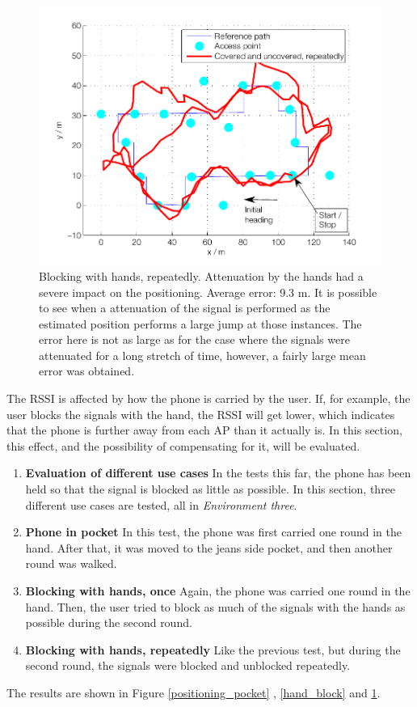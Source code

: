 \documentclass{LTHthesis}
\begin{document}
\begin{figure}

\includegraphics[width=1\textwidth ]{images/adapt_parameters/hand_block_repeatedly}
\caption{Blocking with hands, repeatedly. Attenuation by the hands had a severe impact on the positioning. Average error: 9.3 m. It is possible to see when a attenuation of the signal is performed as the estimated position performs a large jump at those instances. The error here is not as large as for the case where the signals were attenuated for a long stretch of time, however, a fairly large mean error was obtained. }\label{hand_block_repeatedly}
\end{figure}
%

%
The RSSI is affected by how the phone is carried by the user. If, for example, the user blocks the signals with the hand, the RSSI will get lower, which indicates that the phone is further away from each AP than it actually is. In this section, this effect, and the possibility of compensating for it, will be evaluated.
%
\begin{enumerate}
\item \textbf{Evaluation of different use cases}
In the tests this far, the phone has been held so that the signal is blocked as little as possible. In this section, three different use cases are tested, all in \emph{Environment three}. 

\item \textbf{Phone in pocket}
In this test, the phone was first carried one round in the hand. After that, it was moved to the jeans side pocket, and then another round was walked.

\item \textbf{Blocking with hands, once}
Again, the phone was carried one round in the hand. Then, the user tried to block as much of the signals with the hands as possible during the second round.

\item \textbf{Blocking with hands, repeatedly}
Like the previous test, but during the second round, the signals were blocked and unblocked repeatedly. 
\end{enumerate}
%
The results are shown in Figure \ref{positioning_pocket} , \ref{hand_block} and \ref{hand_block_repeatedly}.
\end{document}
